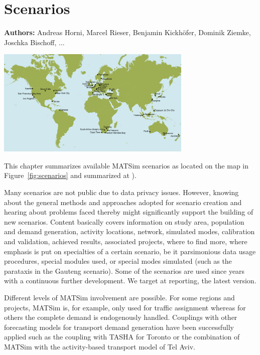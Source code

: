 \chapter{Scenarios}
\label{ch:scenarios}

\hfill \textbf{Authors:} Andreas Horni, Marcel Rieser, Benjamin Kickhöfer, Dominik Ziemke, Joschka Bischoff, ...

\begin{center} \includegraphics[width=0.7\textwidth, angle=0]{using/figures/MATSimModelsMap} \end{center}

This chapter summarizes available MATSim scenarios as located on the map in Figure~\ref{fig:scenarios} and summarized at \citet[][]{MATSIM-T-Scenarios_Webpage_2014}).

Many scenarios are not public due to data privacy issues. However, knowing about the general methods and approaches adopted for scenario creation and hearing about problems faced thereby might significantly support the building of new scenarios. Content basically covers information on study area, population and demand generation, activity locations, network, simulated modes, calibration and validation, achieved results, associated projects, where to find more, where emphasis is put on specialties of a certain scenario, be it parsimonious data usage procedures, special modules used, or special modes simulated (such as the parataxis in the Gauteng scenario). Some of the scenarios are used since years with a continuous further development. We target at reporting, the latest version. 

Different levels of MATSim involvement are possible. For some regions and projects, MATSim is, for example, only used for traffic assignment whereas for others the complete demand is endogenously handled. Couplings with other forecasting models for transport demand generation have been successfully applied such as the coupling with TASHA for Toronto or the combination of MATSim with the activity-based transport model of Tel Aviv.

